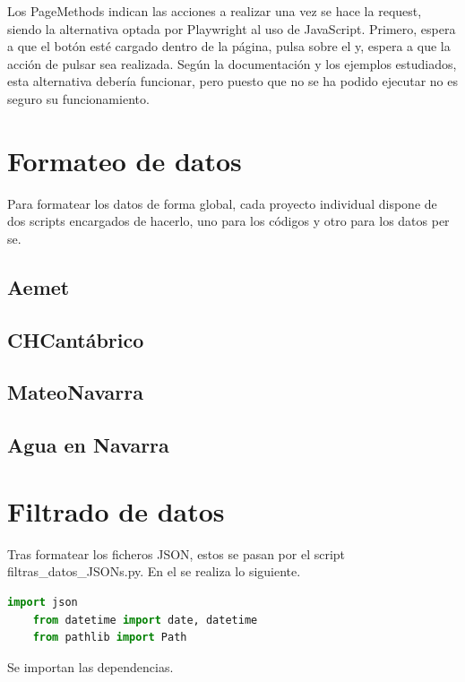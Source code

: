 Los PageMethods indican las acciones a realizar una vez se hace la request, siendo la alternativa optada por Playwright al uso de JavaScript. Primero, espera a que el botón esté cargado dentro de la página, pulsa sobre el y, espera a que la acción de pulsar sea realizada.\newline
\newline
Según la documentación y los ejemplos estudiados, esta alternativa debería funcionar, pero puesto que no se ha podido ejecutar no es seguro su funcionamiento.

\section{Formateo de datos}
Para formatear los datos de forma global, cada proyecto individual dispone de dos scripts encargados de hacerlo, uno para los códigos y otro para los datos per se.\newline
\newline
\subsection{Aemet}

\subsection{CHCantábrico}

\subsection{MateoNavarra}

\subsection{Agua en Navarra}

\section{Filtrado de datos}
Tras formatear los ficheros JSON, estos se pasan por el script filtras\_datos\_JSONs.py. En el se realiza lo siguiente.

\begin{lstlisting}[language=Python, caption={Import necesarios}]
	import json
	from datetime import date, datetime
	from pathlib import Path
\end{lstlisting}

Se importan las dependencias.

